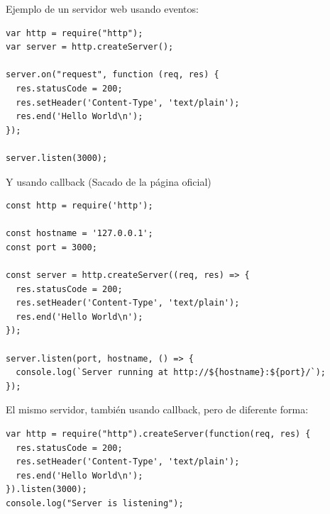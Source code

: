 \documentclass[4paper]{article}
\begin{document}
Ejemplo de un servidor web usando eventos:
\begin{lstlisting}
var http = require("http");
var server = http.createServer();

server.on("request", function (req, res) {
  res.statusCode = 200;
  res.setHeader('Content-Type', 'text/plain');
  res.end('Hello World\n');
});

server.listen(3000);
\end{lstlisting}
Y usando callback (Sacado de la página oficial)
\begin{lstlisting}
const http = require('http');

const hostname = '127.0.0.1';
const port = 3000;

const server = http.createServer((req, res) => {
  res.statusCode = 200;
  res.setHeader('Content-Type', 'text/plain');
  res.end('Hello World\n');
});

server.listen(port, hostname, () => {
  console.log(`Server running at http://${hostname}:${port}/`);
});
\end{lstlisting}
El mismo servidor, también usando callback, pero de diferente forma:
\begin{lstlisting}
var http = require("http").createServer(function(req, res) {
  res.statusCode = 200;
  res.setHeader('Content-Type', 'text/plain');
  res.end('Hello World\n');
}).listen(3000);
console.log("Server is listening");
\end{lstlisting}

\newpage
\end{document}
